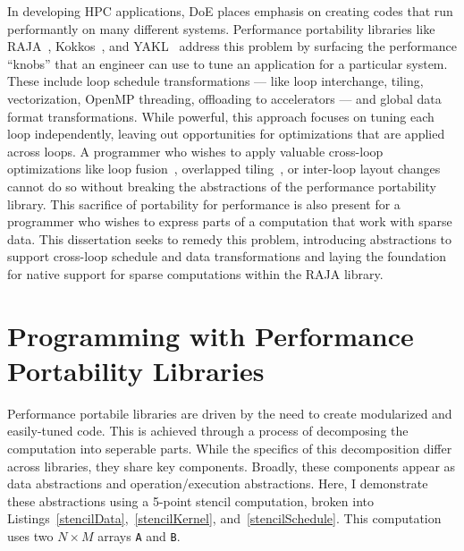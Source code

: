 In developing HPC applications, DoE places emphasis on creating codes that run performantly on many different systems.
Performance portability libraries like RAJA~\cite{hornung2014RAJA}, Kokkos~\cite{edwards2014kokkos}, and YAKL~\cite{norman2022portable} address this problem by surfacing the performance ``knobs'' that an engineer can use to tune an application for a particular system. 
These include loop schedule transformations --- like loop interchange, tiling, vectorization, OpenMP threading, offloading to accelerators --- and global data format transformations.
While powerful, this approach focuses on tuning each loop independently, leaving out opportunities for optimizations that are applied across loops.
A programmer who wishes to apply valuable cross-loop optimizations like loop fusion~\cite{mckinley1996improving}, overlapped tiling~\cite{bertolacci2019using,zhou2012hierarchical,CathieSC14}, or inter-loop layout changes~\cite{kennedy1995automatic,kennedy1998automatic} cannot do so without breaking the abstractions of the performance portability library.
This sacrifice of portability for performance is also present for a programmer who wishes to express parts of a computation that work with sparse data.
This dissertation seeks to remedy this problem, introducing abstractions to support cross-loop schedule and data transformations and laying the foundation for native support for sparse computations within the RAJA library.

\section{Programming with Performance Portability Libraries}
Performance portabile libraries are driven by the need to create modularized and easily-tuned code.
This is achieved through a process of decomposing the computation into seperable parts.
While the specifics of this decomposition differ across libraries, they share key components.
Broadly, these components appear as data abstractions and operation/execution abstractions.
Here, I demonstrate these abstractions using a 5-point stencil computation, broken into Listings~\ref{stencilData},~\ref{stencilKernel}, and~\ref{stencilSchedule}.
This computation uses two $N \times M$ arrays \verb.A. and \verb.B..


